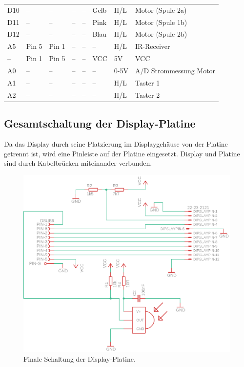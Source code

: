 \documentclass[11pt, titlepage]{report}
\begin{document}
\begin{table}[htbp]
\begin{tabular}{llllllll}
						D10		&--			&--		& --		& --		& Gelb		& H/L	& Motor (Spule 2a)\\
						D11		&--			&--		& --		& --		& Pink		& H/L	& Motor (Spule 1b)\\
						D12		&--			&--		& --		& --		& Blau		& H/L	& Motor (Spule 2b)\\
						A5		& Pin 5		& Pin 1	& --		& --		& --		& H/L	& IR-Receiver\\
						--		& Pin 1		& Pin 5	& --		& --		& VCC		& 5V	& VCC\\
						A0		& --		&--		& --		& --		& --		& 0-5V	& A/D Strommessung Motor\\
						A1		& --		&--		& --		& --		& --		& H/L	& Taster 1\\
						A2		& --		&--		& --		& --		& --		& H/L	& Taster 2\\
	
					\end{tabular}
				\end{table}
				\newpage
			\subsection{Gesamtschaltung der Display-Platine}
				Da das Display durch seine Platzierung im Displaygehäuse von der Platine getrennt ist, wird eine Pinleiste auf der Platine eingesetzt. Display und Platine sind durch Kabelbrücken miteinander verbunden.
				\vspace{3em}
				\begin{figure}[htbp]
					\centering
					\includegraphics[width=\linewidth]{./img/DisplayComplete.png}
					\caption{Finale Schaltung der Display-Platine.
					\label{fig:imgDPComp}}			
				\end{figure}
				\newpage
\end{document}
